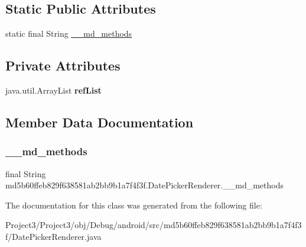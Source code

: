 \subsection*{Static Public Attributes}
\begin{DoxyCompactItemize}
\item 
static final String \hyperlink{classmd5b60ffeb829f638581ab2bb9b1a7f4f3f_1_1DatePickerRenderer_adb56115e96abb1e11b6f6ceebbadb704}{\+\_\+\+\_\+md\+\_\+methods}
\end{DoxyCompactItemize}
\subsection*{Private Attributes}
\begin{DoxyCompactItemize}
\item 
\mbox{\label{classmd5b60ffeb829f638581ab2bb9b1a7f4f3f_1_1DatePickerRenderer_a5c0de23da8ef6f756d8fd093f26c30c6}} 
java.\+util.\+Array\+List {\bfseries ref\+List}
\end{DoxyCompactItemize}


\subsection{Member Data Documentation}
\mbox{\label{classmd5b60ffeb829f638581ab2bb9b1a7f4f3f_1_1DatePickerRenderer_adb56115e96abb1e11b6f6ceebbadb704}} 
\subsubsection{\texorpdfstring{\+\_\+\+\_\+md\+\_\+methods}{\_\_md\_methods}}
{\footnotesize\ttfamily final String md5b60ffeb829f638581ab2bb9b1a7f4f3f.\+Date\+Picker\+Renderer.\+\_\+\+\_\+md\+\_\+methods\hspace{0.3cm}{\ttfamily [static]}}



The documentation for this class was generated from the following file\+:\begin{DoxyCompactItemize}
\item 
Project3/\+Project3/obj/\+Debug/android/src/md5b60ffeb829f638581ab2bb9b1a7f4f3f/Date\+Picker\+Renderer.\+java\end{DoxyCompactItemize}
